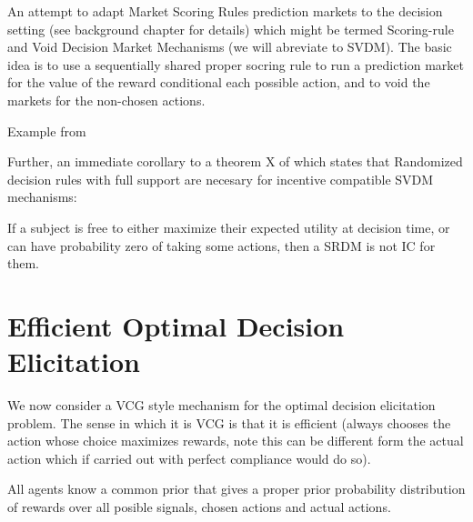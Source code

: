 An attempt to adapt Market Scoring Rules prediction markets to the decision setting (see background chapter for details) which might be termed Scoring-rule and Void Decision Market Mechanisms (we will abreviate to SVDM). The basic idea is to use a sequentially shared proper socring rule to run a prediction market for the value of the reward conditional each possible action, and to void the markets for the non-chosen actions.  


\begin{eg}
	Example from \cite{othman2010decision}
\end{eg}


  

Further, an immediate corollary to a theorem X of \cite{chen2014eliciting} which states that Randomized decision rules with full support are necesary for incentive compatible SVDM mechanisms:

If a subject is free to either maximize their expected utility at decision time, or can have probability zero of taking some actions, then a SRDM is not IC for them.



\section{Efficient Optimal Decision Elicitation}

We now consider a VCG style mechanism for the optimal decision elicitation problem. The sense in which it is VCG is that it is efficient (always chooses the action whose choice maximizes rewards, note this can be different form the actual action which if carried out with perfect compliance would do so).  

All agents know a common prior that gives a proper prior probability distribution of rewards over all posible signals, chosen actions and actual actions.


